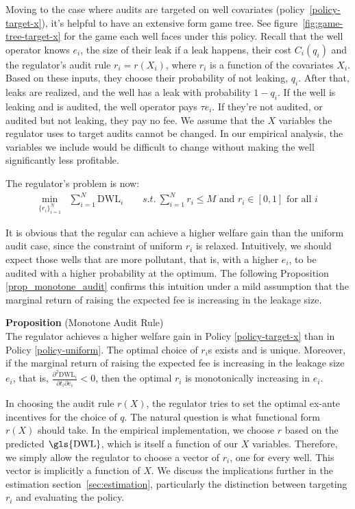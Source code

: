 \documentclass[12pt,oneside,letterpaper]{article}
\newcounter{propositioncounter}
\newlength{\premathenv}
\newlength{\withinmathenv}
\newlength{\postmathenv}
\theoremstyle{definition}
\newenvironment{proposition}[1]{%
\vspace{\premathenv}%
\refstepcounter{propositioncounter}%
\noindent\textbf{Proposition \thepropositioncounter}
{#1}
\vspace{\withinmathenv}
}{%
\vspace{\postmathenv}%
}
\begin{document}
\begin{refsection}
Moving to the case where audits are targeted on well covariates (policy~\ref{policy-target-x}), it's helpful to have an extensive form game tree.
See figure~\ref{fig:game-tree-target-x} for the game each well faces under this policy.
Recall that the well operator knows \(e_i\), the size of their leak if a leak happens, their cost \(C_i(q_i)\) and the regulator's audit rule \(r_i = r(X_i)\), where \(r_i\) is a function of the covariates \(X_i\).
Based on these inputs, they choose their probability of not leaking, \(q_i\).
After that, leaks are realized, and the well has a leak with probability \(1 - q_i\).
If the well is leaking and is audited, the well operator pays \(\tau e_i\).
If they're not audited, or audited but not leaking, they pay no fee.
We assume that the \(X\) variables the regulator uses to target audits cannot be changed.
In our empirical analysis, the variables we include would be difficult to change without making the well significantly less profitable.

The regulator's problem is now:
\begin{align*}
\min_{\{r_i\}^{N}_{i=1}} &  \sum^{N}_{i=1} \text{DWL}_i \qquad
s.t.\ \sum^{N}_{i=1} r_i \leq M \text{ and } r_i \in [0, 1] \text{ for all } i
\end{align*}

It is obvious that the regular can achieve a higher welfare gain than the uniform audit case, since the constraint of uniform $r_i$ is relaxed. Intuitively, we should expect those wells that are more pollutant, that is, with a higher $e_i$, to be audited with a higher probability at the optimum. The following Proposition \autoref{prop_monotone_audit} confirms this intuition under a mild assumption that the marginal return of raising the expected fee is increasing in the leakage size.

\begin{proposition}{(Monotone Audit Rule)}\\ \label{prop_monotone_audit}
The regulator achieves a higher welfare gain in Policy \ref{policy-target-x} than in Policy \ref{policy-uniform}. The optimal choice of $r_i$s exists and is unique. Moreover, if the marginal return of raising the expected fee is increasing in the leakage size $e_i$, that is, $\frac{\partial^2 \text{DWL}_i}{\partial t_i \partial e_i} < 0$, then the optimal $r_i$ is monotonically increasing in $e_i$.
\end{proposition}

In choosing the audit rule \(r(X)\), the regulator tries to set the optimal ex-ante incentives for the choice of \(q\).
The natural question is what functional form \(r(X)\) should take.
In the empirical implementation, we choose \(r\) based on the predicted \(\text{\gls{DWL}}\), which is itself a function of our \(X\) variables.
Therefore, we simply allow the regulator to choose a vector of \(r_i\), one for every well.
This vector is implicitly a function of \(X\).
We discuss the implications further in the estimation section~\ref{sec:estimation},
particularly the distinction between targeting  \(r_i\) and evaluating the policy.


\end{refsection}
\end{document}
